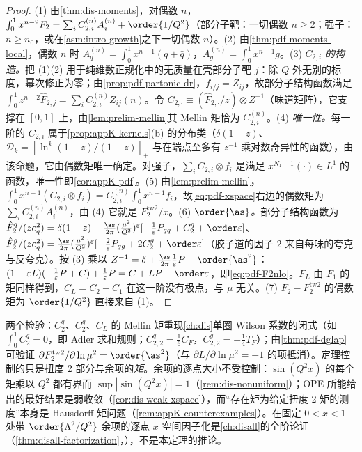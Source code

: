 \begin{proof}
(1) 由\cref{thm:dis-moments}，对偶数 $n$，$\int_0^1x^{n-2}F_2=\sum_iC^{(n)}_{2,i}A^{(n)}_i+\order{1/Q^2}$（部分子靶：一切偶数 $n\ge2$；强子：$n\ge n_0$，或在\cref{asm:intro-growth}之下一切偶数 $n$）。(2) 由\cref{thm:pdf-moments-local}，偶数 $n$ 时 $A^{(n)}_q=\int_0^1x^{n-1}(q+\bar q)$，$A^{(n)}_g=\int_0^1x^{n-1}g$。(3) \emph{$C_{2,i}$ 的构造。}把 (1)(2) 用于纯维数正规化中的无质量在壳部分子靶 $j$：除 $Q$ 外无别的标度，幂次修正为零；由\cref{prop:pdf-partonic-dr}，$f_{i/j}=Z_{ij}$，故部分子结构函数满足 $\int_0^1z^{n-2}\hat F_{2,j}=\sum_iC^{(n)}_{2,i}Z_{ij}(n)$。令 $C_{2,\cdot}\equiv(\hat F_{2,\cdot}/z)\otimes Z^{-1}$（味道矩阵），它支撑在 $[0,1]$ 上，由\cref{lem:prelim-mellin}其 Mellin 矩恰为 $C^{(n)}_{2,i}$。(4) \emph{唯一性。}每一阶的 $C_{2,i}$ 属于\cref{prop:appK-kernels}(b) 的分布类（$\delta(1-z)$、$\mathcal D_k=[\ln^k(1-z)/(1-z)]_+$ 与在端点至多有 $z^{-1}$ 乘对数奇异性的函数），由该命题，它由偶数矩唯一确定。对强子，$\sum_iC_{2,i}\otimes f_i$ 是满足 $x^{N_1-1}(\cdot)\in L^1$ 的函数，唯一性即\cref{cor:appK-pdf}。(5) 由\cref{lem:prelim-mellin}，$\int_0^1x^{n-1}(C_{2,i}\otimes f_i)=C^{(n)}_{2,i}\int_0^1x^{n-1}f_i$，故\cref{eq:pdf-xspace}右边的偶数矩为 $\sum_iC^{(n)}_{2,i}A^{(n)}_i$，由 (4) 它就是 $F_2^{\mathrm{tw2}}/x$。(6) \emph{$\order{\as}$。}部分子结构函数为 $\hat F_2^q/(ze_q^2)=\delta(1-z)+\frac{\as}{2\pi}(\frac{\mu^2}{Q^2})^\varepsilon[-\frac1\varepsilon P_{qq}+C_2^q+\order\varepsilon]$、$\hat F_2^g/(ze_q^2)=\frac{\as}{2\pi}(\frac{\mu^2}{Q^2})^\varepsilon[-\frac2\varepsilon P_{qg}+2C_2^g+\order\varepsilon]$（胶子道的因子 $2$ 来自每味的夸克与反夸克）。按 (3) 乘以 $Z^{-1}=\delta+\frac{\as}{2\pi}\frac1\varepsilon P+\order{\as^2}$：$(1-\varepsilon L)(-\frac1\varepsilon P+C)+\frac1\varepsilon P=C+LP+\order\varepsilon$，即\cref{eq:pdf-F2nlo}。$F_L$ 由 $F_1$ 的矩同样得到，$C_L=C_2-C_1$ 在这一阶没有极点，与 $\mu$ 无关。(7) $F_2-F_2^{\mathrm{tw2}}$ 的偶数矩为 $\order{1/Q^2}$ 直接来自 (1)。
\end{proof}

两个检验：$C_2^q$、$C_2^g$、$C_L$ 的 Mellin 矩重现\cref{ch:dis}单圈 Wilson 系数的闭式（如 $\int_0^1C_2^q=0$，即 Adler 求和规则；$C^q_{2,2}=\frac16C_F$，$C^g_{2,2}=-\frac14T_F$）；由\cref{thm:pdf-dglap}可验证 $\partial F_2^{\mathrm{tw2}}/\partial\ln\mu^2=\order{\as^2}$（与 $\partial L/\partial\ln\mu^2=-1$ 的项抵消）。定理控制的只是扭度 2 部分与余项的\emph{矩}。余项的逐点大小不受控制：$\sin(Q^2x)$ 的每个矩乘以 $Q^2$ 都有界而 $\sup|\sin(Q^2x)|=1$（\cref{rem:dis-nonuniform}）；OPE 所能给出的最好结果是弱收敛（\cref{cor:dis-weak-xspace}），而“存在矩为给定扭度 2 矩的测度”本身是 Hausdorff 矩问题（\cref{rem:appK-counterexamples}）。在固定 $0<x<1$ 处带 $\order{\Lambda^2/Q^2}$ 余项的逐点 $x$ 空间因子化是\cref{ch:disall}的全阶论证（\cref{thm:disall-factorization}，\tagA），不是本定理的推论。

